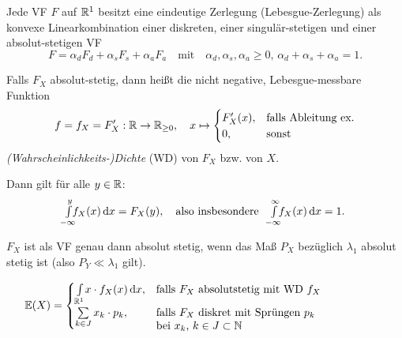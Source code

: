 \documentclass{cheat-sheet}
\newcommand{\E}{\mathbb{E}} %
\begin{document}
\begin{satz}
  Jede VF $F$ auf $\mathbb{R}^1$ besitzt eine eindeutige Zerlegung (Lebesgue-Zerlegung) als konvexe Linearkombination einer diskreten, einer singulär-stetigen und einer absolut-stetigen VF
  \[ F = \alpha_d F_d + \alpha_s F_s + \alpha_a F_a \quad \text{mit} \quad \alpha_d, \alpha_s, \alpha_a \geq 0, \, \alpha_d {+} \alpha_s {+} \alpha_a = 1. \]
\end{satz}

\begin{defn}
  Falls $F_X$ absolut-stetig, dann heißt die nicht negative, Lebesgue-messbare Funktion
  \[ f = f_X = F'_X : \mathbb{R} \to \mathbb{R}_{\geq 0}, \quad x \mapsto \begin{cases} F'_X(x), & \text{falls Ableitung ex.} \\ 0, & \text{sonst} \end{cases} \]
  \emph{(Wahrscheinlichkeits-)Dichte} (WD) von $F_X$  bzw. von $X$.
\end{defn}

\begin{bem}
  Dann gilt für alle $y \in \mathbb{R}$:
  \[ \Int{\mathclap{-\infty}}{y}{f_X(x)}{x} = F_X(y), \quad \text{also insbesondere} \quad \Int{\mathclap{-\infty}}{\infty}{f_X(x)}{x} = 1. \]
\end{bem}

\begin{bem}
  $F_X$ ist als VF genau dann absolut stetig, wenn das Maß $P_X$ bezüglich $\lambda_1$ absolut stetig ist (also $P_Y \ll \lambda_1$ gilt).
\end{bem}



\begin{satz}\mbox{}\vspace{-16pt}
  \[ \E(X) = \begin{cases}
    \Int{\R^1}{}{x \cdot f_X(x)}{x}, & \text{falls $F_X$ absolutstetig mit WD $f_X$} \\
    \sum_{k \in J} x_k \cdot p_k, & \parbox[t]{.6\textwidth}{falls $F_X$ diskret mit Sprüngen $p_k$ \\ bei $x_k$, $k \in J \subset \N$}
  \end{cases} \]
\end{satz}

\end{document}
